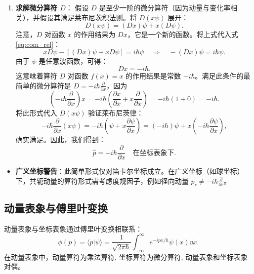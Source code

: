 \begin{enumerate}
	\item \textbf{求解微分算符 $D$}：
	假设 $D$ 是至少一阶的微分算符（因为动量与变化率相关），并假设其满足莱布尼茨积法则。将 $D(x\psi)$ 展开：
	\begin{equation}
		D(x\psi) = (D x) \psi + x (D \psi).
	\end{equation}
	注意，$D$ 对函数 $x$ 的作用结果为 $D x$，它是一个新的函数。将上式代入式 \eqref{eq:com_rel}：
	\begin{equation}
		x D\psi - \left[ (D x) \psi + x D\psi \right] = i\hbar \psi \quad \Rightarrow \quad -(D x) \psi = i\hbar \psi.
	\end{equation}
	由于 $\psi$ 是任意波函数，可得：
	\begin{equation}
		D x = -i\hbar.
	\end{equation}
	这意味着算符 $D$ 对函数 $f(x)=x$ 的作用结果是常数 $-i\hbar$。满足此条件的最简单的微分算符是 $\displaystyle D = -i\hbar \frac{\partial}{\partial x}$，因为
	\begin{equation}
		\left( -i\hbar \frac{\partial}{\partial x} \right) x = -i\hbar \left( \frac{\partial x}{\partial x} + x \frac{\partial}{\partial x} \right) = -i\hbar (1 + 0) = -i\hbar.
	\end{equation}
	将此形式代入 $D(x\psi)$ 验证莱布尼茨律：
	\begin{equation}
		-i\hbar \frac{\partial}{\partial x} (x\psi) = -i\hbar \left( \psi + x \frac{\partial \psi}{\partial x} \right) = (-i\hbar) \psi + x \left( -i\hbar \frac{\partial \psi}{\partial x} \right),
	\end{equation}
	确实满足。因此，我们得到：
	\begin{equation}
		\boxed{\hat{p} = -i\hbar \frac{\partial}{\partial x} \quad \text{在坐标表象下}}.
	\end{equation}
\end{enumerate}

\begin{itemize}
	
	\item \textbf{广义坐标警告}：此简单形式仅对笛卡尔坐标成立。在广义坐标（如球坐标）下，共轭动量的算符形式需考虑度规因子，例如径向动量 $p_r \neq -i\hbar \frac{\partial}{\partial r}$。
	
\end{itemize}
\subsection{动量表象与傅里叶变换}
动量表象与坐标表象通过傅里叶变换相联系：
\[
\phi(p) = \langle p | \psi \rangle = \frac{1}{\sqrt{2\pi\hbar}} \int_{-\infty}^{\infty} e^{-ipx/\hbar} \psi(x)  \dd x.
\]
在动量表象中，动量算符为乘法算符, 坐标算符为微分算符, 动量表象和坐标表象对偶。
